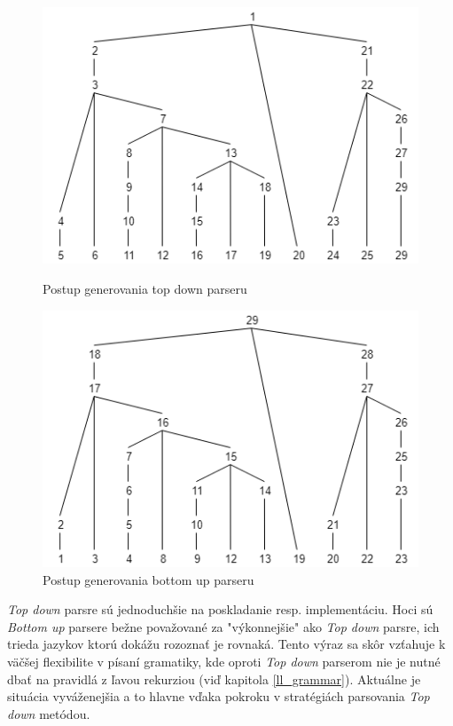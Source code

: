 \begin{figure}[H]
  \centering
  \begin{minipage}[b]{0.45\textwidth}
    \includegraphics[width=\textwidth]{figures/parseTreeExampleTopDown.png}
    \caption{Postup generovania top down parseru}
    \label{fig:parseTreeExampleTopDown}
  \end{minipage}
  \hfill
  \begin{minipage}[b]{0.45\textwidth}
    \includegraphics[width=\textwidth]{figures/parseTreeExampleBottomUp.png}
    \caption{Postup generovania bottom up parseru}
    \label{fig:parseTreeExampleBottomUp}
  \end{minipage}
\end{figure}

\textit{Top down} parsre sú jednoduchšie na poskladanie resp. implementáciu. Hoci sú \textit{Bottom up} parsere bežne považované za "výkonnejšie"{ }ako \textit{Top down} parsre, ich trieda jazykov ktorú dokážu rozoznať je rovnaká\cite{aho1972theory}. Tento výraz sa skôr vzťahuje k väčšej flexibilite v písaní gramatiky, kde oproti \textit{Top down} parserom nie je nutné dbať na pravidlá z ľavou rekurziou (viď kapitola \ref{ll_grammar}). Aktuálne je situácia vyváženejšia a to hlavne vďaka pokroku v stratégiách parsovania \textit{Top down} metódou. 

